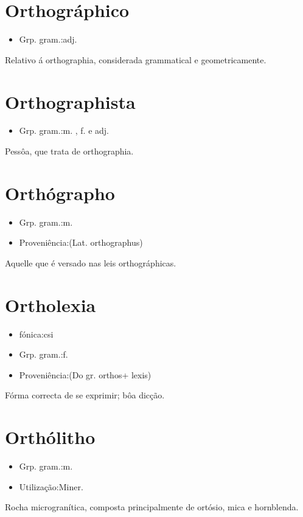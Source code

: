 \section{Orthográphico}
\begin{itemize}
\item {Grp. gram.:adj.}
\end{itemize}
Relativo á orthographia, considerada grammatical e geometricamente.
\section{Orthographista}
\begin{itemize}
\item {Grp. gram.:m. ,  f.  e  adj.}
\end{itemize}
Pessôa, que trata de orthographia.
\section{Orthógrapho}
\begin{itemize}
\item {Grp. gram.:m.}
\end{itemize}
\begin{itemize}
\item {Proveniência:(Lat. \textunderscore orthographus\textunderscore )}
\end{itemize}
Aquelle que é versado nas leis orthográphicas.
\section{Ortholexia}
\begin{itemize}
\item {fónica:csi}
\end{itemize}
\begin{itemize}
\item {Grp. gram.:f.}
\end{itemize}
\begin{itemize}
\item {Proveniência:(Do gr. \textunderscore orthos\textunderscore  + \textunderscore lexis\textunderscore )}
\end{itemize}
Fórma correcta de se exprimir; bôa dicção.
\section{Orthólitho}
\begin{itemize}
\item {Grp. gram.:m.}
\end{itemize}
\begin{itemize}
\item {Utilização:Miner.}
\end{itemize}
Rocha microgranítica, composta principalmente de ortósio, mica e hornblenda.
